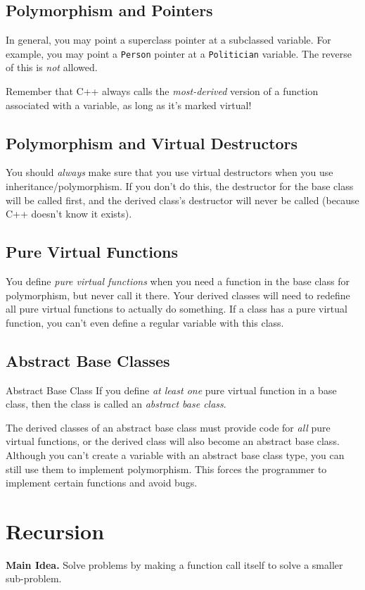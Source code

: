 \documentclass[class=article, crop=false]{standalone}
\begin{document}
  \subsection{Polymorphism and Pointers}
  In general, you may point a superclass pointer at a subclassed variable. For example, you may point a \texttt{Person} pointer at a \texttt{Politician} variable. The reverse of this is \emph{not} allowed. \par
  Remember that C++ always calls the \emph{most-derived} version of a function associated with a variable, as long as it's marked virtual!
  \subsection{Polymorphism and Virtual Destructors}
  You should \emph{always} make sure that you use virtual destructors when you use inheritance/polymorphism. If you don't do this, the destructor for the base class will be called first, and the derived class's destructor will never be called (because C++ doesn't know it exists).
  \subsection{Pure Virtual Functions}
  You define \emph{pure virtual functions} when you need a function in the base class for polymorphism, but never call it there. Your derived classes will need to redefine all pure virtual functions to actually do something. If a class has a pure virtual function, you can't even define a regular variable with this class. 
  \subsection{Abstract Base Classes}
  \begin{definition}{Abstract Base Class}
    If you define \emph{at least one} pure virtual function in a base class, then the class is called an \emph{abstract base class}.
  \end{definition}
  The derived classes of an abstract base class must provide code for \emph{all} pure virtual functions, or the derived class will also become an abstract base class. Although you can't create a variable with an abstract base class type, you can still use them to implement polymorphism. This forces the programmer to implement certain functions and avoid bugs.
  \section{Recursion}
  \textbf{Main Idea.} Solve problems by making a function call itself to solve a smaller sub-problem.
\end{document}
